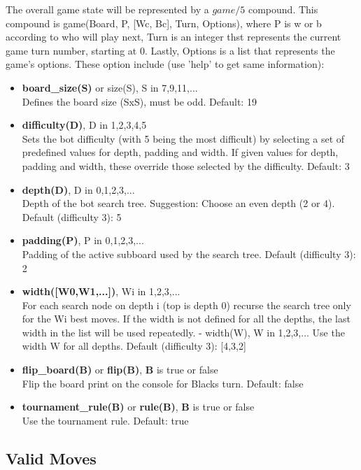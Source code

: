\documentclass[12pt,a4paper,notitlepage]{article}
\begin{document}
The overall game state will be represented by a $game/5$ compound. This compound is game(Board, P, [Wc, Bc], Turn, Options), where P is w or b according to who will play next, Turn is an integer thst represents the current game turn number, starting at 0. Lastly, Options is a list that represents the game's options. These option include (use 'help' to get same information): 

\begin{itemize}
	\item \textbf{board\_size(S)} or size(S), S in {7,9,11,...}\\
	Defines the board size (SxS), must be odd.
	Default: 19
	\item \textbf{difficulty(D)}, D in {1,2,3,4,5}\\
	Sets the bot difficulty (with 5 being the most
	difficult) by selecting a set of predefined values
	for depth, padding and width. If given values for
	depth, padding and width, these override those selected
	by the difficulty.
	Default: 3
	\item \textbf{depth(D)}, D in {0,1,2,3,...}\\
	Depth of the bot search tree.
	Suggestion: Choose an even depth (2 or 4).
	Default (difficulty 3): 5
	\item \textbf{padding(P)}, P in {0,1,2,3,...}\\
	Padding of the active subboard used by the search tree.
	Default (difficulty 3): 2
	\item \textbf{width([W0,W1,...])}, Wi in {1,2,3,...}\\
	For each search node on depth i (top is depth 0)
	recurse the search tree only for the Wi best moves.
	If the width is not defined for all the depths, the
	last width in the list will be used repeatedly.
	- width(W), W in {1,2,3,...}
	Use the width W for all depths.
	Default (difficulty 3): [4,3,2]
	\item \textbf{flip\_board(B)} or \textbf{flip(B)}, \textbf{B} is true or false\\
	Flip the board print on the console for Blacks turn.
	Default: false
	\item \textbf{tournament\_rule(B)} or \textbf{rule(B)}, \textbf{B} is true or false\\
	Use the tournament rule.
	Default: true
\end{itemize}

\subsection{Valid Moves}
\label{subsec:validmoves}
\end{document}
